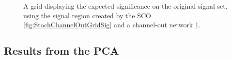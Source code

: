 \begin{figure}[H]
{\begin{subfigure}{.5\textwidth}
        \vspace{-1cm}
        \caption{}
        \label{fig:ChannelOutGridSig}
    \end{subfigure}
    }
    \caption{A grid displaying the expected significance on the original signal set, using the signal region 
    created by the \acs{SCO} \ref{fig:StochChannelOutGridSig} and a channel-out network \ref{fig:ChannelOutGridSig}.}
    \label{fig:SCOCO}
\end{figure}

\subsection{Results from the \ac{PCA}}\label{appendix:PCA}
\begin{figure}[H]
\end{figure}
